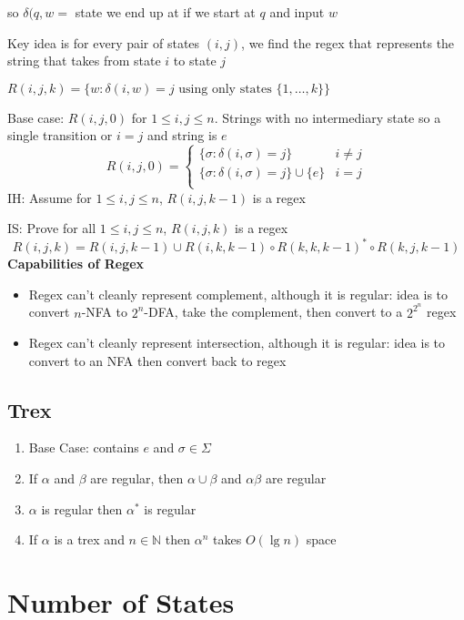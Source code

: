 \documentclass{article}
\begin{document}
  so $\delta(q, w = $ state we end up at if we start at $q$ and input $w$ \medskip

  Key idea is for every pair of states $(i,j)$, we find the regex that represents the string that takes from state $i$ to state $j$

  $R(i, j, k) = \{w \colon \delta(i, w) = j \text{ using only states } \{1, \ldots, k\} \}$ \medskip

  Base case: $R(i, j, 0)$ for $1 \leq i,j \leq n$. Strings with no intermediary state so a single transition or $i = j$ and string is $e$
  \[R(i, j, 0) = 
    \begin{cases}
    \{\sigma \colon \delta(i, \sigma) = j\} & i \neq j\\
    \{\sigma \colon \delta(i, \sigma) = j\} \cup \{e\} & i = j\\
  \end{cases}
  \]
  IH: Assume for $1 \leq i, j \leq n$, $R(i, j, k-1)$ is a regex

  IS: Prove for all $1 \leq i, j \leq n$, $R(i, j, k)$ is a regex
  \[R(i, j, k) = R(i, j, k-1) \cup R(i, k, k-1)\circ R(k, k, k-1)^* \circ R(k,j, k-1)\]
  \textbf{Capabilities of Regex}
  \begin{itemize}
    \item Regex can't cleanly represent complement, although it is regular: idea is to convert $n$-NFA to $2^n$-DFA, take the complement, then convert to a $2^{2^n}$ regex
    \item Regex can't cleanly represent intersection, although it is regular: idea is to convert to an NFA then convert back to regex
  \end{itemize}
  \subsection{Trex}
  \begin{enumerate}
    \item Base Case: contains $e$ and $\sigma \in \Sigma$
    \item If $\alpha$ and $\beta$ are regular, then $\alpha \cup \beta$ and $\alpha \beta$ are regular
    \item $\alpha$ is regular then $\alpha^*$ is regular
    \item If $\alpha$ is a trex and $n \in \mathbb{N}$ then $\alpha^n$ takes $O(\lg{n})$ space
  \end{enumerate}
  \section{Number of States}
\end{document}
